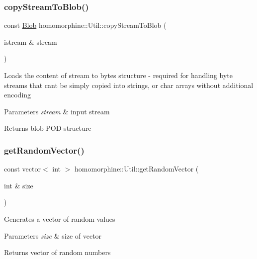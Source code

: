 \subsubsection{\texorpdfstring{copyStreamToBlob()}{copyStreamToBlob()}}
{\footnotesize\ttfamily const \mbox{\hyperlink{structblob__t}{Blob}} homomorphine\+::\+Util\+::copy\+Stream\+To\+Blob (\begin{DoxyParamCaption}\item[{istream \&}]{stream }\end{DoxyParamCaption})\hspace{0.3cm}{\ttfamily [static]}}

Loads the content of stream to bytes structure -\/ required for handling byte streams that can\textquotesingle{}t be simply copied into strings, or char arrays without additional encoding


\begin{DoxyParams}{Parameters}
{\em stream} & input stream \\
\hline
\end{DoxyParams}
\begin{DoxyReturn}{Returns}
blob P\+OD structure 
\end{DoxyReturn}
\mbox{\label{classhomomorphine_1_1_util_a2dcf1d83028f3d47ba49b80696fefef7}} 
\subsubsection{\texorpdfstring{getRandomVector()}{getRandomVector()}}
{\footnotesize\ttfamily const vector$<$ int $>$ homomorphine\+::\+Util\+::get\+Random\+Vector (\begin{DoxyParamCaption}\item[{int \&}]{size }\end{DoxyParamCaption})\hspace{0.3cm}{\ttfamily [static]}}

Generates a vector of random values


\begin{DoxyParams}{Parameters}
{\em size} & size of vector \\
\hline
\end{DoxyParams}
\begin{DoxyReturn}{Returns}
vector of random numbers 
\end{DoxyReturn}
\mbox{\label{classhomomorphine_1_1_util_acf2321afce14e9c20ca572159592e0e2}} 
